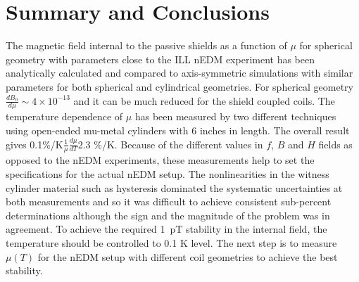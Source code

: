 \documentclass[review]{elsarticle}
\begin{document}
\section{Summary and Conclusions}
The magnetic field internal to the passive shields as a function of $\mu$ for spherical geometry with parameters close to the ILL nEDM experiment has been analytically calculated and compared to axis-symmetric simulations with similar parameters for both spherical and cylindrical geometries. For spherical geometry $\frac{dB_0}{d\mu}\sim 4 \times 10^{-13}$ and it can be much reduced for the shield coupled coils.
The temperature dependence of $\mu$ has been measured by two different techniques using open-ended mu-metal cylinders with 6 inches in length. The overall result gives 0.1\%/K$\frac{1}{\mu}\frac{d\mu}{dT}$2.3 \%/K. Because of the different values in $f$, $B$ and $H$ fields as opposed to the nEDM experiments, these  measurements help to set the specifications for the actual nEDM setup. The nonlinearities in the witness cylinder material such as hysteresis dominated the systematic uncertainties at both measurements and so it was difficult to achieve consistent sub-percent determinations although the sign and the magnitude of the problem was in agreement.
To achieve the required 1~pT stability in the internal field, the temperature should be controlled to 0.1 K level.
The next step is to measure $\mu(T)$ for the nEDM setup with different coil geometries to achieve the best stability.



\end{document}
